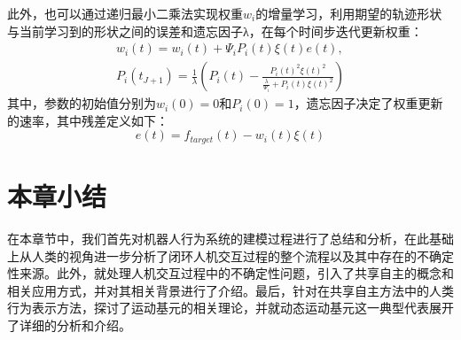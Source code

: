 此外，也可以通过递归最小二乘法实现权重$w_i$的增量学习，利用期望的轨迹形状与当前学习到的形状之间的误差和遗忘因子λ，在每个时间步迭代更新权重：
\begin{equation}
    \begin{gathered}
    w_i(t)=w_i(t)+\Psi_i P_i\left(t\right) \xi(t) e\left(t\right), \\
    P_i\left(t_{J+1}\right)=\frac{1}{\lambda}\left(P_i\left(t\right)-\frac{P_i\left(t\right)^2 \xi(t)^2}{\frac{\lambda}{\Psi_i}+P_i\left(t\right) \xi(t)^2}\right)
    \end{gathered}
    \label{eq:2-17}
\end{equation}
其中，参数的初始值分别为$w_i(0)=0$和$P_i(0)=1$，遗忘因子决定了权重更新的速率，其中残差定义如下：
\begin{equation}
    e\left(t\right)=f_{target}\left(t\right)-w_i\left(t\right) \xi(t)
    \label{eq:2-18}
\end{equation}
\section{本章小结}
在本章节中，我们首先对机器人行为系统的建模过程进行了总结和分析，在此基础上从人类的视角进一步分析了闭环人机交互过程的整个流程以及其中存在的不确定性来源。此外，就处理人机交互过程中的不确定性问题，引入了共享自主的概念和相关应用方式，并对其相关背景进行了介绍。最后，针对在共享自主方法中的人类行为表示方法，探讨了运动基元的相关理论，并就动态运动基元这一典型代表展开了详细的分析和介绍。